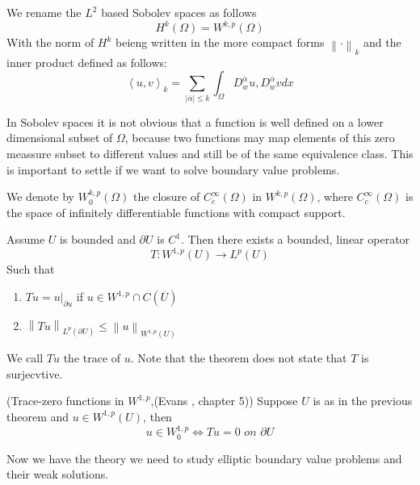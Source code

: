 \documentclass[../Main/main.tex]{subfiles}
\begin{document}
	\begin{definition}
		We rename the $L^2$ based Sobolev spaces as follows 
		\begin{equation*}
			H^k(\Omega) = W^{k,p}(\Omega)
		\end{equation*}
		With the norm of $H^k$ beieng written in the more compact forms $\left \| \cdot \right \|_k$ and the inner product defined as follows:
		\begin{equation*}
			\left \langle u,v \right \rangle_k = \sum_{|\overline{\alpha}| \leq k} \int_{\Omega}D_w^{\overline{\alpha}}u,D_w^{\overline{\alpha}}v dx
		\end{equation*}
	\end{definition}

	In Sobolev spaces it is not obvious that a function is well defined on a lower dimensional subset of $\Omega$, because two functions may map elements of this zero meassure subset to different values and still be of the same equivalence class. This is important to settle if we want to solve boundary value problems.
	\begin{definition}
		We denote by $W_0^{k,p}(\Omega)$ the closure of $C_c^{\infty}(\Omega)$ in $W^{k,p}(\Omega)$, where $C_c^{\infty}(\Omega)$ is the space of infinitely differentiable functions with compact support.
	\end{definition}
	\begin{theorem}
		Assume $U$ is bounded and $\partial U$ is $C^1$. Then there exists a bounded, linear operator
		\begin{equation*}
			T: W^{1,p}(U) \rightarrow L^p(U)
		\end{equation*}
		Such that
		\begin{enumerate}
			\item $ Tu = u|_{\partial u} $ if $u\in W^{1,p}\cap C(\overline{U})$
			\item $\left \|Tu\right\|_{L^p(\partial U)}\leq \left \| u \right \|_{W^{1,p}(U)}$
		\end{enumerate}
	\end{theorem}
	We call $Tu$ the trace of $u$. Note that the theorem does not state that $T$ is surjecvtive.
	\begin{theorem}(Trace-zero functions in $W^{1,p}$,(Evans \cite{evans10}, chapter 5))
		Suppose $U$ is as in the previous theorem and $u\in W^{1,p}(U)$, then
		\begin{equation}
			u\in W^{1,p}_0 \Leftrightarrow  Tu=0 \textit{ on }\partial U
		\end{equation}
	\end{theorem}
	Now we have the theory we need to study elliptic boundary value problems and their weak solutions.
	
\end{document}
